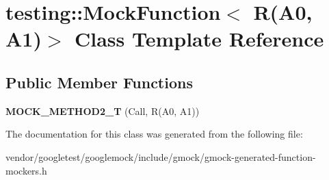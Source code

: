 \hypertarget{classtesting_1_1_mock_function_3_01_r_07_a0_00_01_a1_08_4}{}\section{testing\+:\+:Mock\+Function$<$ R(A0, A1)$>$ Class Template Reference}
\label{classtesting_1_1_mock_function_3_01_r_07_a0_00_01_a1_08_4}
\subsection*{Public Member Functions}
\begin{DoxyCompactItemize}
\item 
\mbox{\label{classtesting_1_1_mock_function_3_01_r_07_a0_00_01_a1_08_4_a5a4d673a3252cab866f0a4fa97486190}} 
{\bfseries M\+O\+C\+K\+\_\+\+M\+E\+T\+H\+O\+D2\+\_\+T} (Call, R(A0, A1))
\end{DoxyCompactItemize}


The documentation for this class was generated from the following file\+:\begin{DoxyCompactItemize}
\item 
vendor/googletest/googlemock/include/gmock/gmock-\/generated-\/function-\/mockers.\+h\end{DoxyCompactItemize}
